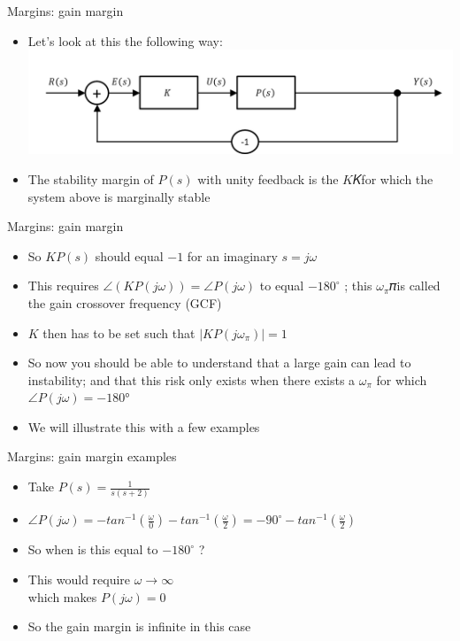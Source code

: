 \begin{frame}{Margins: gain margin}
\begin{itemize}
\item Let’s look at this the following way:
\\ \includegraphics[width=0.9\linewidth]{Afbeelding19}
\item The stability margin of $P(s)$ with unity feedback is the $K$𝐾for which the system above is marginally stable
\end{itemize}
\end {frame}

\begin{frame}{Margins: gain margin}
\begin{itemize}
\item So $KP(s)$ should equal $-1$ for an imaginary $s=j\omega$
\item This requires $\angle(KP(j\omega)) = \angle P(j\omega)$ to equal $-180^{\circ}$ ; this $ \omega_\pi $𝜋is called the gain crossover frequency (GCF)
\item $K$ then has to be set such that $|KP(j\omega_\pi)|=1 $
\item So now you should be able to understand that a large gain can lead to instability; and that this risk only exists when there exists a $\omega_\pi$ for which $\angle P(j\omega)= -180°$
\item We will illustrate this with a few examples
\end{itemize}
\end {frame}

\begin{frame}{Margins: gain margin examples}
\begin{itemize}
\item Take $ P(s) = \frac{1}{s(s+2)} $
\item $\angle P(j\omega) = -tan^{-1}(\frac{\omega}{0}) -tan^{-1}(\frac{\omega}{2}) = -90^{\circ} - tan^{-1}(\frac{\omega}{2})$
\item So when is this equal to $-180^{\circ} $ ?
\item This would require $\omega \rightarrow \infty $
\\ which makes $P(j\omega)=0$
\item So the gain margin is infinite in this case
\end{itemize}
\end {frame}

